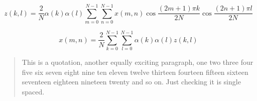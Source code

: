 \begin{equation} \label{eqn:dct}
z(k,l) = \frac{2}{N} \alpha(k) \alpha(l) \sum_{m=0}^{N-1} \sum_{n=0}^{N-1}
         x(m,n) \cos \frac{ (2m+1) \pi k}{2N} \cos \frac{ (2n+1) \pi l}{2N}
\end{equation}

\begin{equation} \label{eqn:idct}
x(m,n) = \frac{2}{N} \sum_{k=0}^{N-1} \sum_{l=0}^{N-1}
         \alpha(k) \alpha(l) z(k,l)
\end{equation}

\begin{quotation}
This is a quotation, another equally exciting paragraph, one two three
four five six seven eight nine ten eleven twelve thirteen fourteen
fifteen sixteen seventeen eighteen nineteen twenty and so on. Just
checking it is single spaced.
\end{quotation}
